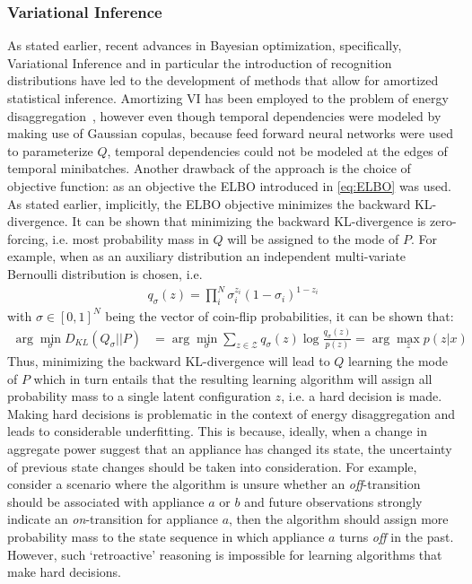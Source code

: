 \documentclass[11pt]{cmuthesis} %
\begin{document}
\subsubsection{Variational Inference}
As stated earlier, recent advances in Bayesian optimization, specifically, Variational Inference and in particular the introduction of recognition distributions have led to the development of methods that allow for amortized statistical inference. 
Amortizing VI has been employed to the problem of energy disaggregation~\cite{ng2016scaling}, however even though temporal dependencies were modeled by making use of Gaussian copulas, because feed forward neural networks were used to parameterize $Q$, temporal dependencies could not be modeled at the edges of temporal minibatches. Another drawback of the approach is the choice of objective function: as an objective the ELBO introduced in \eqref{eq:ELBO} was used. As stated earlier, implicitly, the ELBO objective minimizes the backward KL-divergence. It can be shown that minimizing the backward KL-divergence is zero-forcing, i.e. most probability mass in $Q$ will be assigned to the mode of $P$. For example, when as an auxiliary distribution an independent multi-variate Bernoulli distribution is chosen, i.e.
\begin{align*}
 q_\sigma(z) = \prod_i^N \sigma_i^{z_i}(1-\sigma_i)^{1-z_i}
\end{align*}
with $\sigma \in [0,1]^N$ being the vector of coin-flip probabilities, it can be shown that:
\begin{align*}
 \arg \min_{\sigma} D_{KL}(Q_\sigma||P) &= \arg \min_{\sigma} \sum_{z \in \mathcal{Z}} q_\sigma(z)\log \frac{q_\sigma(z)}{p(z)} = \arg \max_z p(z|x)
\end{align*}
Thus, minimizing the backward KL-divergence will lead to $Q$ learning the mode of $P$ which in turn entails that the resulting learning algorithm will assign all probability mass to a single latent configuration $z$, i.e. a hard decision is made. Making hard decisions is problematic in the context of energy disaggregation and leads to considerable underfitting. This is because, ideally, when a change in aggregate power suggest that an appliance has changed its state, the uncertainty of previous state changes should be taken into consideration. For example, consider a scenario where the algorithm is unsure whether an \emph{off}-transition should be associated with appliance $a$ or $b$ and future observations strongly indicate an \emph{on}-transition for appliance $a$, then the algorithm should assign more probability mass to the state sequence in which appliance $a$ turns \emph{off} in the past. However, such `retroactive' reasoning is impossible for learning algorithms that make hard decisions.
\end{document}
